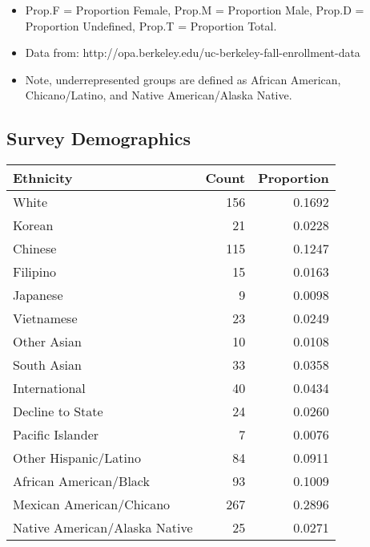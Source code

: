 \documentclass{article}\usepackage[]{graphicx}\usepackage[]{color}
\begin{document}
\begin{itemize}
\item Prop.F = Proportion Female, Prop.M = Proportion Male, Prop.D = Proportion Undefined, Prop.T = Proportion Total.
\item Data from: http://opa.berkeley.edu/uc-berkeley-fall-enrollment-data
\item Note, underrepresented groups are defined as African American, Chicano/Latino, and Native American/Alaska Native.
\end{itemize}

\subsection{Survey Demographics}
\begin{table}[ht]
\centering
\begin{tabular}{lrr}
  \hline
Ethnicity & Count & Proportion \\ 
  \hline
                         White & 156 & 0.1692 \\ 
                          Korean & 21 & 0.0228 \\ 
                         Chinese & 115 & 0.1247 \\ 
                        Filipino & 15 & 0.0163 \\ 
                        Japanese & 9 & 0.0098 \\ 
                      Vietnamese & 23 & 0.0249 \\ 
                     Other Asian & 10 & 0.0108 \\ 
                     South Asian & 33 & 0.0358 \\ 
                   International & 40 & 0.0434 \\ 
                Decline to State & 24 & 0.0260 \\ 
                Pacific Islander & 7 & 0.0076 \\ 
           Other Hispanic/Latino & 84 & 0.0911 \\ 
          African American/Black & 93 & 0.1009 \\ 
        Mexican American/Chicano & 267 & 0.2896 \\ 
   Native American/Alaska Native & 25 & 0.0271 \\ 
   \hline
\end{tabular}
\end{table}
\end{document}
